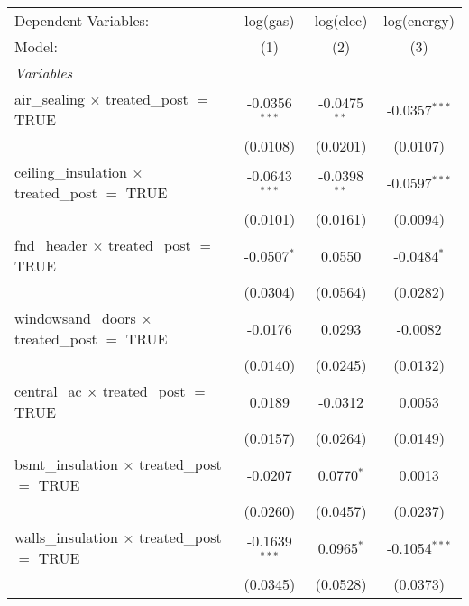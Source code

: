 \begingroup
\centering
\begin{tabular}{lccc}
   \tabularnewline \midrule \midrule
   Dependent Variables:                                      & log(gas)        & log(elec)      & log(energy)\\  
   Model:                                                    & (1)             & (2)            & (3)\\  
   \midrule
   \emph{Variables}\\
   air\_sealing $\times$ treated\_post $=$ TRUE              & -0.0356$^{***}$ & -0.0475$^{**}$ & -0.0357$^{***}$\\   
                                                             & (0.0108)        & (0.0201)       & (0.0107)\\   
   ceiling\_insulation $\times$ treated\_post $=$ TRUE       & -0.0643$^{***}$ & -0.0398$^{**}$ & -0.0597$^{***}$\\   
                                                             & (0.0101)        & (0.0161)       & (0.0094)\\   
   fnd\_header $\times$ treated\_post $=$ TRUE               & -0.0507$^{*}$   & 0.0550         & -0.0484$^{*}$\\   
                                                             & (0.0304)        & (0.0564)       & (0.0282)\\   
   windowsand\_doors $\times$ treated\_post $=$ TRUE         & -0.0176         & 0.0293         & -0.0082\\   
                                                             & (0.0140)        & (0.0245)       & (0.0132)\\   
   central\_ac $\times$ treated\_post $=$ TRUE               & 0.0189          & -0.0312        & 0.0053\\   
                                                             & (0.0157)        & (0.0264)       & (0.0149)\\   
   bsmt\_insulation $\times$ treated\_post $=$ TRUE          & -0.0207         & 0.0770$^{*}$   & 0.0013\\   
                                                             & (0.0260)        & (0.0457)       & (0.0237)\\   
   walls\_insulation $\times$ treated\_post $=$ TRUE         & -0.1639$^{***}$ & 0.0965$^{*}$   & -0.1054$^{***}$\\   
                                                             & (0.0345)        & (0.0528)       & (0.0373)\\   

\end{tabular}
